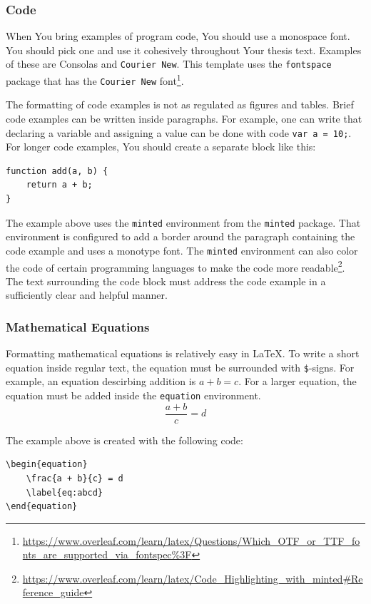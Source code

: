 \subsubsection{Code}
When You bring examples of program code, You should use a monospace font. You should pick one and use it cohesively throughout Your thesis text. Examples of these are Consolas and \texttt{Courier New}. This template uses the \verb|fontspace| package that has the \texttt{Courier New} font\footnote{\url{https://www.overleaf.com/learn/latex/Questions/Which_OTF_or_TTF_fonts_are_supported_via_fontspec\%3F}}.

The formatting of code examples is not as regulated as figures and tables. Brief code examples can be written inside paragraphs. For example, one can write that declaring a variable and assigning a value can be done with code \verb|var a = 10;|. For longer code examples, You should create a separate block like this:

\begin{verbatim}
function add(a, b) {
    return a + b;
}
\end{verbatim}

The example above uses the \verb|minted| environment from the \verb|minted| package. That environment is configured to add a border around the paragraph containing the code example and uses a monotype font. The \verb|minted| environment can also color the code of certain programming languages to make the code more readable\footnote{\url{https://www.overleaf.com/learn/latex/Code_Highlighting_with_minted\#Reference_guide}}. The text surrounding the code block must address the code example in a sufficiently clear and helpful manner.

\subsubsection{Mathematical Equations}
Formatting mathematical equations is relatively easy in LaTeX. To write a short equation inside regular text, the equation must be surrounded with \verb|$|-signs. For example, an equation descirbing addition is $a+b=c$. For a larger equation, the equation must be added inside the \verb|equation| environment.
\begin{equation}
    \frac{a + b}{c} = d
    \label{eq:abcd}
\end{equation}

The example above is created with the following code:
\begin{verbatim}
\begin{equation}
    \frac{a + b}{c} = d
    \label{eq:abcd}
\end{equation}
\end{verbatim}


